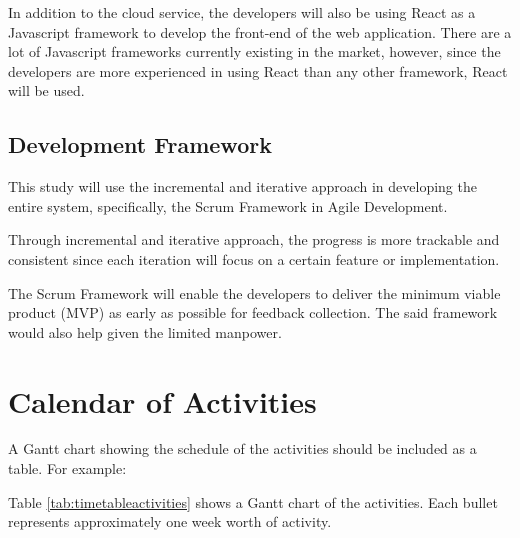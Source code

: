 In addition to the cloud service, the developers will also be using React as a Javascript framework to develop the front-end of the web application. There are a lot of Javascript frameworks currently existing in the market, however, since the developers are more experienced in using React than any other framework, React will be used.
\subsection{Development Framework}
This study will use the incremental and iterative approach in developing the entire system, specifically, the Scrum Framework in Agile Development.

Through incremental and iterative approach, the progress is more trackable and consistent since each iteration will focus on a certain feature or implementation.

The Scrum Framework will enable the developers to deliver the minimum viable product (MVP) as early as possible for feedback collection. The said framework would also help given the limited manpower.


\section{Calendar of Activities}

A Gantt chart showing the schedule of the activities should be included as a table. For example:

Table \ref{tab:timetableactivities} shows a Gantt chart of the activities.  Each bullet represents approximately
one week worth of activity.

%
%
\newcommand{\weekone}{\textbullet}
\newcommand{\weektwo}{\textbullet \textbullet}
\newcommand{\weekthree}{\textbullet \textbullet \textbullet}
\newcommand{\weekfour}{\textbullet \textbullet \textbullet \textbullet}

%
%
\begin{comment}
   \newcommand{\weekone}{$\star$}
   \newcommand{\weektwo}{$\star \star$}
   \newcommand{\weekthree}{$\star \star \star$}
   \newcommand{\weekfour}{$\star \star \star \star$ }
\end{comment}



